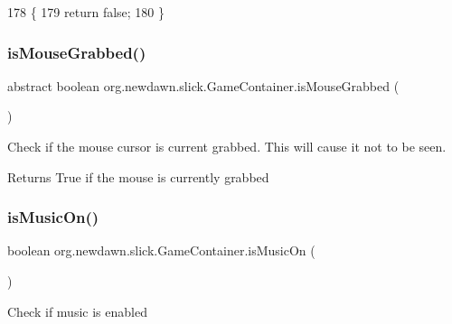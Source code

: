 \begin{DoxyCode}
178                                   \{
179         \textcolor{keywordflow}{return} \textcolor{keyword}{false};
180     \}
\end{DoxyCode}
\mbox{\label{classorg_1_1newdawn_1_1slick_1_1_game_container_ad560cb00f8b4695169ec71ff73571c41}} 
\subsubsection{\texorpdfstring{is\+Mouse\+Grabbed()}{isMouseGrabbed()}}
{\footnotesize\ttfamily abstract boolean org.\+newdawn.\+slick.\+Game\+Container.\+is\+Mouse\+Grabbed (\begin{DoxyParamCaption}{ }\end{DoxyParamCaption})\hspace{0.3cm}{\ttfamily [abstract]}}

Check if the mouse cursor is current grabbed. This will cause it not to be seen.

\begin{DoxyReturn}{Returns}
True if the mouse is currently grabbed 
\end{DoxyReturn}
\mbox{\label{classorg_1_1newdawn_1_1slick_1_1_game_container_a9cdc14b8f01e7673e2eac174add41a1a}} 
\subsubsection{\texorpdfstring{is\+Music\+On()}{isMusicOn()}}
{\footnotesize\ttfamily boolean org.\+newdawn.\+slick.\+Game\+Container.\+is\+Music\+On (\begin{DoxyParamCaption}{ }\end{DoxyParamCaption})\hspace{0.3cm}{\ttfamily [inline]}}

Check if music is enabled

